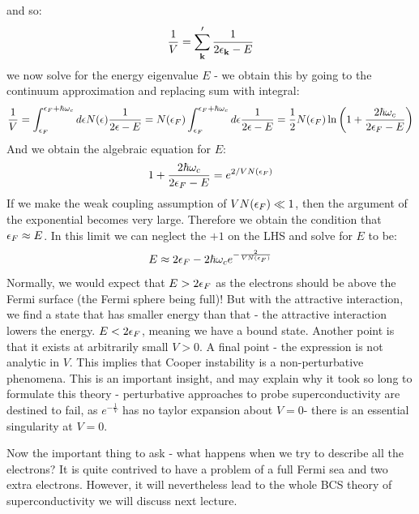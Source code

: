 and so:
\begin{equation}
    \frac{1}{V} = \sum_{\mathbf{k}}' \frac{1}{2\epsilon_{\mathbf{k}} - E}
\end{equation}
we now solve for the energy eigenvalue $E$ - we obtain this by going to the continuum approximation and replacing sum with integral:
\begin{equation}
    \frac{1}{V} = \int_{\epsilon_F}^{\epsilon_F + \hbar \omega_c} d\epsilon N(\epsilon)\frac{1}{2\epsilon - E} = N(\epsilon_F) \int_{\epsilon_F}^{\epsilon_F + \hbar \omega_c}d\epsilon \frac{1}{2\epsilon - E} = \frac{1}{2}N(\epsilon_F)\ln\left(1 + \frac{2\hbar \omega_c}{2\epsilon_F - E}\right)
\end{equation}
And we obtain the algebraic equation for $E$:
\begin{equation}
    1 + \frac{2\hbar \omega_c}{2\epsilon_F - E} = e^{2/VN(\epsilon_F)}
\end{equation}
If we make the weak coupling assumption of $VN(\epsilon_F) \ll 1$, then the argument of the exponential becomes very large. Therefore we obtain the condition that $\epsilon_F \approx E$. In this limit we can neglect the $+1$ on the LHS and solve for $E$ to be:
\begin{equation}
    E \approx 2\epsilon_F - 2\hbar \omega_c e^{-\frac{2}{VN(\epsilon_F)}}
\end{equation}
Normally, we would expect that $E > 2\epsilon_F$ as the electrons should be above the Fermi surface (the Fermi sphere being full)! But with the attractive interaction, we find a state that has smaller energy than that - the attractive interaction lowers the energy. $E < 2\epsilon_F$, meaning we have a bound state. Another point is that it exists at arbitrarily small $V > 0$. A final point - the expression is not analytic in $V$. This implies that Cooper instability is a non-perturbative phenomena. This is an important insight, and may explain why it took so long to formulate this theory - perturbative approaches to probe superconductivity are destined to fail, as $e^{-\frac{1}{V}}$ has no taylor expansion about $V = 0$- there is an essential singularity at $V = 0$.

Now the important thing to ask - what happens when we try to describe all the electrons? It is quite contrived to have a problem of a full Fermi sea and two extra electrons. However, it will nevertheless lead to the whole BCS theory of superconductivity we will discuss next lecture.


